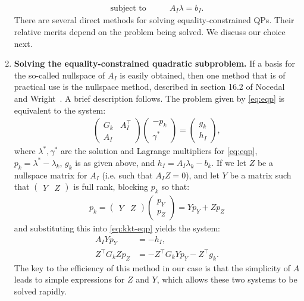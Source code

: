 \documentclass[eikonal.tex]{subfiles}
\begin{document}
\begin{enumerate}
\begin{equation}
\begin{aligned}
      \mbox{subject to} & \qquad A_I \lambda = b_I.
    \end{aligned}
  \end{equation}
  There are several direct methods for solving equality-constrained
  QPs. Their relative merits depend on the problem being solved. We
  discuss our choice next.
\item \textbf{Solving the equality-constrained quadratic subproblem.}
  If a basis for the so-called nullspace of $A_I$ is easily obtained,
  then one method that is of practical use is the nullspace method,
  described in section 16.2 of Nocedal and
  Wright~\cite{nocedal2006numerical}. A brief description follows. The
  problem given by \cref{eq:eqp} is equivalent to the system:
  \begin{equation}
    \label{eq:kkt-eqp}
    \begin{aligned}
      \begin{pmatrix}
        G_k & A_I^\top \\
        A_I &
      \end{pmatrix} \begin{pmatrix}
        -p_k \\ \gamma^*
      \end{pmatrix} = \begin{pmatrix}
        g_k \\ h_I
      \end{pmatrix},
    \end{aligned}
  \end{equation}
  where $\lambda^*, \gamma^*$ are the solution and Lagrange
  multipliers for \cref{eq:eqp}, $p_k = \lambda^* - \lambda_k$, $g_k$
  is as given above, and $h_I = A_I \lambda_k - b_k$. If we let $Z$ be
  a nullspace matrix for $A_I$ (i.e. such that $A_IZ = 0$), and let
  $Y$ be a matrix such that $\begin{pmatrix} Y & Z \end{pmatrix}$ is
  full rank, blocking $p_k$ so that:
  \begin{align*}
    p_k = \begin{pmatrix} Y & Z \end{pmatrix} \begin{pmatrix}
      p_Y \\ p_Z
    \end{pmatrix} = Y p_Y + Z p_Z
  \end{align*}
  and substituting this into \cref{eq:kkt-eqp} yields the system:
  \begin{align*}
    A_I Y p_Y &= -h_I, \\
    Z^\top G_k Z p_Z &= -Z^\top G_k Y p_Y - Z^\top g_k.
  \end{align*}
  The key to the efficiency of this method in our case is that the
  simplicity of $A$ leads to simple expressions for $Z$ and $Y$, which
  allows these two systems to be solved rapidly.
\end{enumerate}
\end{document}
